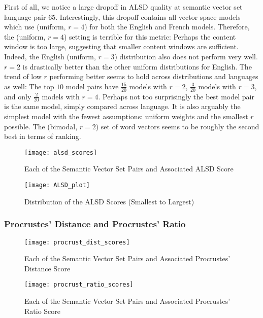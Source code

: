 \documentclass[12pt, usenames]{article}
\theoremstyle{definition}
\theoremstyle{definition}
\theoremstyle{definition}
\begin{document}
First of all, we notice a large dropoff in ALSD quality at semantic vector set language pair $65$. Interestingly, this dropoff contains all vector space models which use (uniform, $r = 4$) for both the English and French models. Therefore, the (uniform, $r = 4$) setting is terrible for this metric: Perhaps the content window is too large, suggesting that smaller content windows are sufficient. Indeed, the English (uniform, $r = 3$) distribution also does not perform very well. $r = 2$ is drastically better than the other uniform distributions for English. The trend of low $r$ performing better seems to hold across distributions and languages as well: The top $10$ model pairs have $\frac{15}{20}$ models with $r = 2$, $\frac{3}{20}$ models with $r = 3$, and only $\frac{2}{20}$ models with $r = 4$. Perhaps not too surprisingly the best model pair is the same model, simply compared across language. It is also arguably the simplest model with the fewest assumptions: uniform weights and the smallest $r$ possible. The (bimodal, $r = 2$) set of word vectors seems to be roughly the second best in terms of ranking.

\begin{figure}
\texttt{[image: alsd\_scores]}
\centering
\caption{Each of the Semantic Vector Set Pairs and Associated ALSD Score}
\label{fig:ALSD_scores}
\end{figure}

\begin{figure}
\texttt{[image: ALSD\_plot]}
\centering
\caption{Distribution of the ALSD Scores (Smallest to Largest)}
\label{fig:ALSD_plt}
\end{figure}


\subsubsection{Procrustes' Distance and Procrustes' Ratio}

\begin{figure}
\texttt{[image: procrust\_dist\_scores]}
\centering
\caption{Each of the Semantic Vector Set Pairs and Associated Procrustes' Distance Score}
\label{fig:Procrust_dist_scores}
\end{figure}
 

\begin{figure}
\texttt{[image: procrust\_ratio\_scores]}
\centering
\caption{Each of the Semantic Vector Set Pairs and Associated Procrustes' Ratio Score}
\label{fig:Procrust_ratio_scores}
\end{figure}
\end{document}
